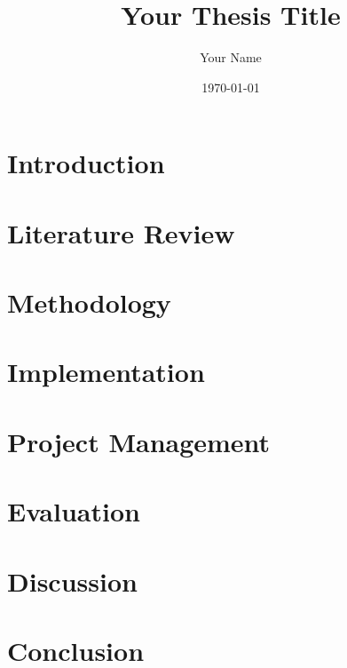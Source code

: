 \documentclass{report}
\title{Your Thesis Title}
\author{Your Name}
\date{\today}
\begin{document}
\maketitle

\begin{abstract}
\end{abstract}

\tableofcontents

\chapter{Introduction}


\chapter{Literature Review}


\chapter{Methodology}


\chapter{Implementation}


\chapter{Project Management}

\chapter{Evaluation}


\chapter{Discussion}

\chapter{Conclusion}
\end{document}
